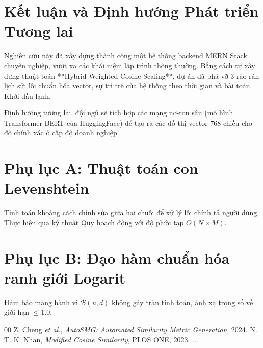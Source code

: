 \documentclass[journal]{IEEEtran}
\begin{document}
\section{Kết luận và Định hướng Phát triển Tương lai}
\label{sec:conclusion}

Nghiên cứu này đã xây dựng thành công một hệ thống backend MERN Stack chuyên nghiệp, vượt xa các khái niệm lập trình thông thường. Bằng cách tự xây dựng thuật toán **Hybrid Weighted Cosine Scaling**, dự án đã phá vỡ 3 rào rản lịch sử: lỗi chuẩn hóa vector, sự trì trệ của hệ thống theo thời gian và bài toán Khởi đầu lạnh.

Định hướng tương lai, đội ngũ sẽ tích hợp các mạng nơ-ron sâu (mô hình Transformer BERT của HuggingFace) để tạo ra các đồ thị vector 768 chiều cho độ chính xác ở cấp độ doanh nghiệp.

\appendices
\section{Phụ lục A: Thuật toán con Levenshtein}
Tính toán khoảng cách chỉnh sửa giữa hai chuỗi để xử lý lỗi chính tả người dùng. Thực hiện qua kỹ thuật Quy hoạch động với độ phức tạp $O(N \times M)$.

\section{Phụ lục B: Đạo hàm chuẩn hóa ranh giới Logarit}
Đảm bảo mảng hành vi $\mathcal{B}(u,d)$ không gây tràn tính toán, ánh xạ trọng số về giới hạn $\leq 1.0$.

\begin{thebibliography}{00}
 Z. Cheng \textit{et al.}, \textit{AutoSMG: Automated Similarity Metric Generation}, 2024.
 N. T. K. Nhan, \textit{Modified Cosine Similarity}, PLOS ONE, 2023.
...
\end{thebibliography}
\end{document}
